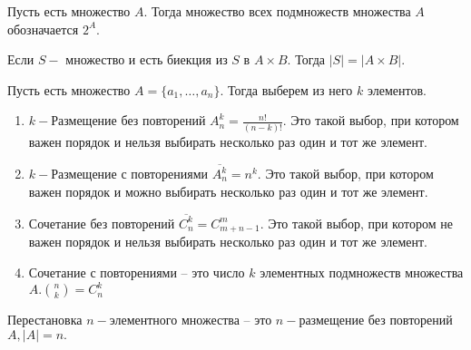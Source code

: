 \begin{definition}
    Пусть есть множество $A.$ Тогда множество всех подмножеств множества $A$ обозначается $2 ^ A.$
\end{definition}

\begin{lemma}
    Если $S -$  множество и есть биекция из $S$ в $A \times B.$ Тогда $|S| = |A \times B|.$
\end{lemma}

\begin{definition}
    Пусть есть множество $A = \{ a_1, \dots, a_n \}.$ Тогда выберем из него $k$ элементов.
    \begin{enumerate}
        \item $k-$Размещение без повторений $A_{n}^{k} = \frac{n!}{(n - k)!}.$ Это такой выбор, при котором важен порядок и нельзя выбирать несколько раз один и тот же элемент.

        \item $k-$Размещение с повторениями $\overline{A_{n}^{k}} = n ^ k.$ Это такой выбор, при котором важен порядок и можно выбирать несколько раз один и тот же элемент.

        \item Сочетание без повторений $\overline{C_{n} ^ {k}} = C_{m + n - 1} ^ {m}.$ Это такой выбор, при котором не важен порядок и нельзя выбирать несколько раз один и тот же элемент.

        \item Сочетание с повторениями -- это число $k$ элементных подмножеств множества $A.\binom{n}{k} = C_{n} ^ {k}$ 
    \end{enumerate}
\end{definition}

\begin{definition}
    Перестановка $n-$элементного множества -- это $n-$размещение без повторений $A, |A| = n.$
\end{definition}

